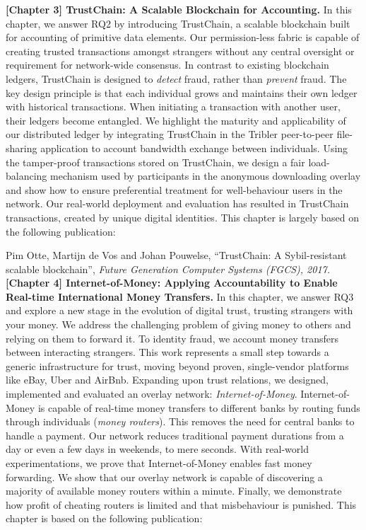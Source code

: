 \textbf{[Chapter 3] TrustChain: A Scalable Blockchain for Accounting.}
In this chapter, we answer RQ2 by introducing TrustChain, a scalable blockchain built for accounting of primitive data elements.
Our permission-less fabric is capable of creating trusted transactions amongst strangers without any central oversight or requirement for network-wide consensus.
In contrast to existing blockchain ledgers, TrustChain is designed to \emph{detect} fraud, rather than \emph{prevent} fraud.
The key design principle is that each individual grows and maintains their own ledger with historical transactions.
When initiating a transaction with another user, their ledgers become entangled.
We highlight the maturity and applicability of our distributed ledger by integrating TrustChain in the Tribler peer-to-peer file-sharing application to account bandwidth exchange between individuals.
Using the tamper-proof transactions stored on TrustChain, we design a fair load-balancing mechanism used by participants in the anonymous downloading overlay and show how to ensure preferential treatment for well-behaviour users in the network. %
Our real-world deployment and evaluation has resulted in  TrustChain transactions, created by  unique digital identities.
This chapter is largely based on the following publication:

Pim Otte, Martijn de Vos and Johan Pouwelse, \enquote{TrustChain: A Sybil-resistant scalable blockchain}, \emph{Future Generation Computer Systems (FGCS), 2017.}\\

\textbf{[Chapter 4] Internet-of-Money: Applying Accountability to Enable Real-time International Money Transfers.}
In this chapter, we answer RQ3 and explore a new stage in the evolution of digital trust, trusting strangers with your money.
We address the challenging problem of giving money to others and relying on them to forward it.
To identity fraud, we account money transfers between interacting strangers.
This work represents a small step towards a generic infrastructure for trust, moving beyond proven, single-vendor platforms like eBay, Uber and AirBnb.
Expanding upon trust relations, we designed, implemented and evaluated an overlay network: \emph{Internet-of-Money}.
Internet-of-Money is capable of real-time money transfers to different banks by routing funds through individuals (\emph{money routers}).
This removes the need for central banks to handle a payment.
Our network reduces traditional payment durations from a day or even a few days in weekends, to mere seconds.
With real-world experimentations, we prove that Internet-of-Money enables fast money forwarding.
We show that our overlay network is capable of discovering a majority of available money routers within a minute.
Finally, we demonstrate how profit of cheating routers is limited and that misbehaviour is punished.
This chapter is based on the following publication:

